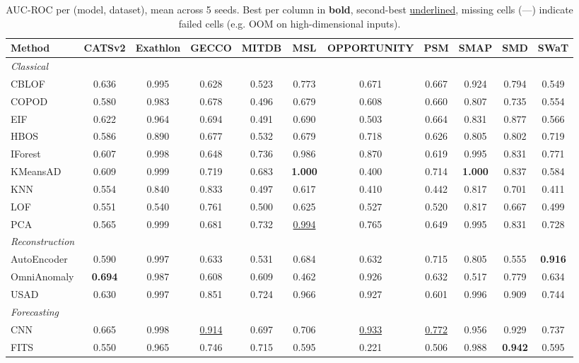 \begin{table}[t]
\centering
\small
\caption{AUC-ROC per (model, dataset), mean across 5 seeds. Best per column in \textbf{bold}, second-best \underline{underlined}, missing cells (---) indicate failed cells (e.g. OOM on high-dimensional inputs).}
\label{tab:by-dataset-auc-roc}
\begin{tabular}{lcccccccccc}
\toprule
Method & CATSv2 & Exathlon & GECCO & MITDB & MSL & OPPORTUNITY & PSM & SMAP & SMD & SWaT \\
\midrule
\multicolumn{11}{l}{\textit{Classical}} \\
CBLOF & 0.636 & 0.995 & 0.628 & 0.523 & 0.773 & 0.671 & 0.667 & 0.924 & 0.794 & 0.549 \\
COPOD & 0.580 & 0.983 & 0.678 & 0.496 & 0.679 & 0.608 & 0.660 & 0.807 & 0.735 & 0.554 \\
EIF & 0.622 & 0.964 & 0.694 & 0.491 & 0.690 & 0.503 & 0.664 & 0.831 & 0.877 & 0.566 \\
HBOS & 0.586 & 0.890 & 0.677 & 0.532 & 0.679 & 0.718 & 0.626 & 0.805 & 0.802 & 0.719 \\
IForest & 0.607 & 0.998 & 0.648 & 0.736 & 0.986 & 0.870 & 0.619 & 0.995 & 0.831 & 0.771 \\
KMeansAD & 0.609 & 0.999 & 0.719 & 0.683 & \textbf{1.000} & 0.400 & 0.714 & \textbf{1.000} & 0.837 & 0.584 \\
KNN & 0.554 & 0.840 & 0.833 & 0.497 & 0.617 & 0.410 & 0.442 & 0.817 & 0.701 & 0.411 \\
LOF & 0.551 & 0.540 & 0.761 & 0.500 & 0.625 & 0.527 & 0.520 & 0.817 & 0.667 & 0.499 \\
PCA & 0.565 & 0.999 & 0.681 & 0.732 & \underline{0.994} & 0.765 & 0.649 & 0.995 & 0.831 & 0.728 \\
\midrule
\multicolumn{11}{l}{\textit{Reconstruction}} \\
AutoEncoder & 0.590 & 0.997 & 0.633 & 0.531 & 0.684 & 0.632 & 0.715 & 0.805 & 0.555 & \textbf{0.916} \\
OmniAnomaly & \textbf{0.694} & 0.987 & 0.608 & 0.609 & 0.462 & 0.926 & 0.632 & 0.517 & 0.779 & 0.634 \\
USAD & 0.630 & 0.997 & 0.851 & 0.724 & 0.966 & 0.927 & 0.601 & 0.996 & 0.909 & 0.744 \\
\midrule
\multicolumn{11}{l}{\textit{Forecasting}} \\
CNN & 0.665 & 0.998 & \underline{0.914} & 0.697 & 0.706 & \underline{0.933} & \underline{0.772} & 0.956 & 0.929 & 0.737 \\
FITS & 0.550 & 0.965 & 0.746 & 0.715 & 0.595 & 0.221 & 0.506 & 0.988 & \textbf{0.942} & 0.595 \\

\end{tabular}
\end{table}
